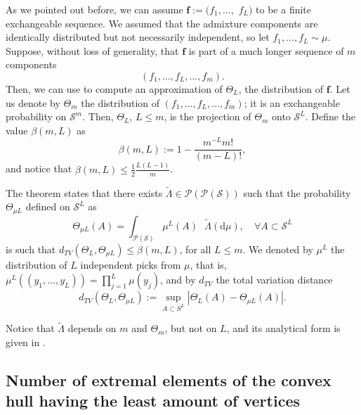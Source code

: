 \documentclass[12pt, reqno]{amsart}
\theoremstyle{definition}
\begin{document}

As we pointed out before, we can assume $\mathbf{f}:=({f}_1,\ldots,$ ${f}_{L})$ to be a {finite} exchangeable sequence. We assumed that the admixture components are identically distributed but not necessarily independent, so let $f_1,\ldots,f_L \sim \mu$. Suppose, without loss of generality, that $\mathbf{f}$ is part of a much longer sequence of $m$ components
$$\left( {f}_1,\ldots,{f}_{L},\ldots,{f}_{m} \right).$$ 
Then, we can use \cite[Theorem 13]{diaconis1980} to compute an approximation of $\Theta_L$, the distribution of $\mathbf{f}$. Let us denote by $\Theta_m$ the distribution of $\left( {f}_1,\ldots,{f}_{L},\ldots,{f}_{m} \right)$; it is an exchangeable probability on $\mathcal{S}^m$. Then, $\Theta_L$, $L \leq m$, is the projection of $\Theta_m$ onto $\mathcal{S}^L$. Define the value $\beta(m,L)$ as
$$\beta(m,L):=1-\frac{m^{-L}m!}{(m-L)!},$$
and notice that $\beta(m,L) \leq \frac{1}{2} \frac{L(L-1)}{m}$. 




The theorem states that there exists $\tilde{\Lambda} \in \mathscr{P}(\mathscr{P}(\mathcal{S}))$ such that the probability $\Theta_{\mu L}$ defined on $\mathcal{S}^L$ as
$$\Theta_{\mu L}(A)=\int_{\mathscr{P}(\mathcal{S})} \mu^{L}(A) \text{ } \tilde{\Lambda}(\text{d}\mu) , \quad \forall A \subset \mathcal{S}^L$$
is such that
$d_{TV}(\Theta_L,\Theta_{\mu L}) \leq \beta(m,L)$, for all $L \leq m$. 
We denoted by $\mu^L$ the distribution of $L$ independent picks from $\mu$, that is, $\mu^L((y_1,\ldots,y_L))=\prod_{j=1}^L \mu(y_j)$, and by $d_{TV}$ the total variation distance $$d_{TV}(\Theta_L,\Theta_{\mu L}):=\sup\limits_{A \subset S^L} \left| \Theta_L(A)-\Theta_{\mu L}(A) \right| \text{.}$$

Notice that $\tilde{\Lambda}$ depends on $m$ and $\Theta_m$, but not on $L$, and its analytical form is given in \cite[Proof of Theorem 13]{diaconis1980}.
\subsection{Number of extremal elements of the convex hull having the least amount of vertices}\label{app_2}
\end{document}

